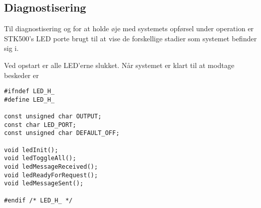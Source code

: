 \subsection{Diagnostisering}
Til diagnostisering og for at holde øje med systemets opførsel under operation er STK500's LED porte brugt til at vise de forskellige stadier som systemet befinder sig i.

Ved opstart er alle LED'erne slukket. Når systemet er klart til at modtage beskeder er 

\begin{lstlisting}[caption=Hello caption]
#ifndef LED_H_
#define LED_H_

const unsigned char OUTPUT;
const char LED_PORT;
const unsigned char DEFAULT_OFF;

void ledInit();
void ledToggleAll();
void ledMessageReceived();
void ledReadyForRequest();
void ledMessageSent();

#endif /* LED_H_ */
\end{lstlisting}